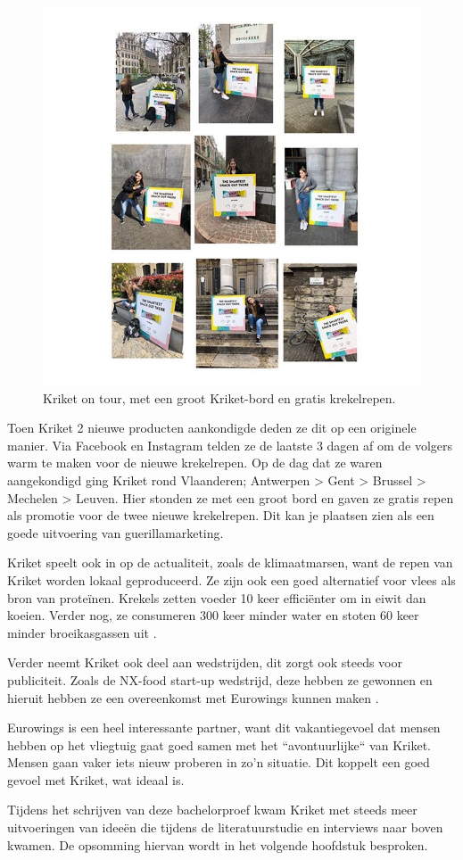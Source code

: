 \begin{figure}[h!]
	\includegraphics[width=150mm]{img/kriket-on-tour.jpg}
	\centering
	\caption{Kriket on tour, met een groot Kriket-bord en gratis krekelrepen.}
	\label{fig:kriket-on-tour}
\end{figure}

Toen Kriket 2 nieuwe producten aankondigde deden ze dit op een originele manier. Via Facebook en Instagram telden ze de laatste 3 dagen af om de volgers warm te maken voor de nieuwe krekelrepen. Op de dag dat ze waren aangekondigd ging Kriket rond Vlaanderen; Antwerpen > Gent > Brussel > Mechelen > Leuven. Hier stonden ze met een groot bord en gaven ze gratis repen als promotie voor de twee nieuwe krekelrepen. Dit kan je plaatsen zien als een goede uitvoering van guerillamarketing.

Kriket speelt ook in op de actualiteit, zoals de klimaatmarsen, want de repen van Kriket worden lokaal geproduceerd. Ze zijn ook een goed alternatief voor vlees als bron van proteïnen. Krekels zetten voeder 10 keer efficiënter om in eiwit dan koeien. Verder nog, ze consumeren 300 keer minder water en stoten 60 keer minder broeikasgassen uit \autocite{Kriket2018}.

Verder neemt Kriket ook deel aan wedstrijden, dit zorgt ook steeds voor publiciteit. Zoals de NX-food start-up wedstrijd, deze hebben ze gewonnen en hieruit hebben ze een overeenkomst met Eurowings kunnen maken \autocite{KriketEurowings2019}.

Eurowings is een heel interessante partner, want dit vakantiegevoel dat mensen hebben op het vliegtuig gaat goed samen met het ``avontuurlijke`` van Kriket. Mensen gaan vaker iets nieuw proberen in zo'n situatie. Dit koppelt een goed gevoel met Kriket, wat ideaal is.

Tijdens het schrijven van deze bachelorproef kwam Kriket met steeds meer uitvoeringen van ideeën die tijdens de literatuurstudie en interviews naar boven kwamen. De opsomming hiervan wordt in het volgende hoofdstuk besproken.